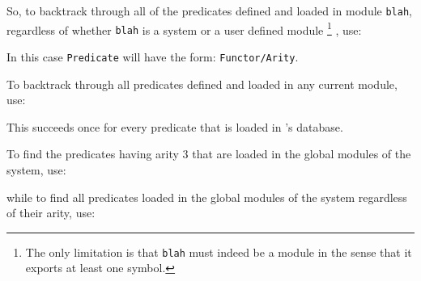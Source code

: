 \begin{description}
\begin{enumerate}
    \end{enumerate}

    So, to backtrack through all of the predicates defined and loaded in module 
    {\tt blah}, regardless of whether {\tt blah} is a system or a user 
    defined module
    \footnote{The only limitation is that {\tt blah} must indeed 
	      be a module in the sense that it exports at least one symbol.}
    , use:


    In this case {\tt Predicate} will have the form: {\tt Functor/Arity}.

    To backtrack through all predicates defined and loaded in any current 
    module, use:


    This succeeds once for every predicate that is loaded in \ourprolog's 
    database.

    To find the predicates having arity 3 that are loaded in the global 
    modules of the system, use: 


    while to find all predicates loaded in the global modules of the system
    regardless of their arity, use:




\end{description}

